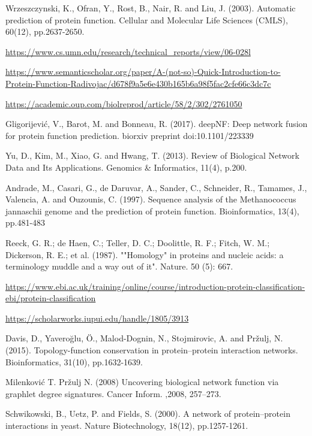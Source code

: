 \documentclass[9pt]{article}
\begin{document}
{\begin{thebibliography}{8}
Wrzeszczynski, K., Ofran, Y., Rost, B., Nair, R. and Liu, J. (2003). Automatic prediction of protein function. Cellular and Molecular Life Sciences (CMLS), 60(12), pp.2637-2650.
 
\url{https://www.cs.umn.edu/research/technical_reports/view/06-028l}

\url{https://www.semanticscholar.org/paper/A-(not-so)-Quick-Introduction-to-Protein-Function-Radivojac/d678f9a5e6e430b165b6a98f5fac2cfe66c3dc7c}

\url{https://academic.oup.com/biolreprod/article/58/2/302/2761050}

Gligorijević, V., Barot, M. and Bonneau, R. (2017). deepNF: Deep network fusion for protein function prediction. biorxiv preprint doi:10.1101/223339

Yu, D., Kim, M., Xiao, G. and Hwang, T. (2013). Review of Biological Network Data and Its Applications. Genomics \& Informatics, 11(4), p.200.

Andrade, M., Casari, G., de Daruvar, A., Sander, C., Schneider, R., Tamames, J., Valencia, A. and Ouzounis, C. (1997). Sequence analysis of the Methanococcus jannaschii genome and the prediction of protein function. Bioinformatics, 13(4), pp.481-483

Reeck, G. R.; de Haen, C.; Teller, D. C.; Doolittle, R. F.; Fitch, W. M.; Dickerson, R. E.; et al. (1987). ""Homology" in proteins and nucleic acids: a terminology muddle and a way out of it". Nature. 50 (5): 667.

\url{https://www.ebi.ac.uk/training/online/course/introduction-protein-classification-ebi/protein-classification}

\url{https://scholarworks.iupui.edu/handle/1805/3913}

Davis, D., Yaveroğlu, Ö., Malod-Dognin, N., Stojmirovic, A. and Pržulj, N. (2015). Topology-function conservation in protein–protein interaction networks. Bioinformatics, 31(10), pp.1632-1639.

Milenković T. Pržulj N. (2008) Uncovering biological network function via graphlet degree signatures. Cancer Inform. ,2008, 257–273.

Schwikowski, B., Uetz, P. and Fields, S. (2000). A network of protein–protein interactions in yeast. Nature Biotechnology, 18(12), pp.1257-1261.


\end{thebibliography}}
\end{document}
